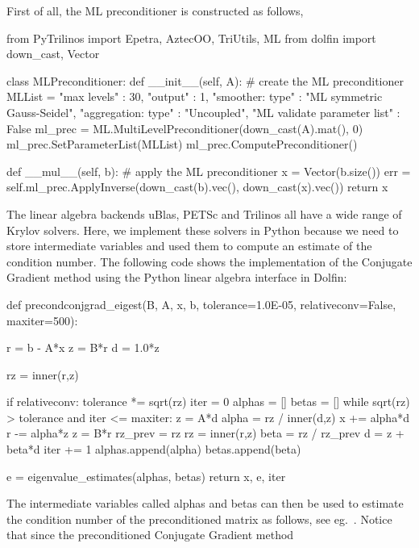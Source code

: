 First of all, the ML preconditioner is constructed as follows,  
\begin{python}
from PyTrilinos import Epetra, AztecOO, TriUtils, ML 
from dolfin import down_cast, Vector 

class MLPreconditioner: 
    def __init__(self, A): 
        # create the ML preconditioner
        MLList = {
              "max levels"        : 30, 
              "output"            : 1,  
              "smoother: type"    : "ML symmetric Gauss-Seidel",
              "aggregation: type" : "Uncoupled",
              "ML validate parameter list" : False
        }
        ml_prec = ML.MultiLevelPreconditioner(down_cast(A).mat(), 0)
        ml_prec.SetParameterList(MLList)
        ml_prec.ComputePreconditioner()

    def __mul__(self, b):
        # apply the ML preconditioner
        x = Vector(b.size())
        err = self.ml_prec.ApplyInverse(down_cast(b).vec(),
                                        down_cast(x).vec())
        return x
\end{python}
The linear algebra backends uBlas, PETSc and Trilinos all have 
a wide range of Krylov solvers. Here, we implement
these solvers in Python because we need to store intermediate
variables and  used them to compute an estimate of the condition number. 
The following code shows the implementation of the Conjugate Gradient method
using the Python linear algebra interface in Dolfin:
\begin{python}
def precondconjgrad_eigest(B, A, x, b, tolerance=1.0E-05, 
                           relativeconv=False, maxiter=500):

    r = b - A*x
    z = B*r
    d = 1.0*z

    rz = inner(r,z)

    if relativeconv: tolerance *= sqrt(rz)
    iter = 0
    alphas = []
    betas = []
    while sqrt(rz) > tolerance and iter <= maxiter:
        z = A*d
        alpha = rz / inner(d,z)
        x += alpha*d
        r -= alpha*z
        z = B*r
        rz_prev = rz
        rz = inner(r,z)
        beta =  rz / rz_prev
        d = z + beta*d
        iter += 1
        alphas.append(alpha)
        betas.append(beta)

    e = eigenvalue_estimates(alphas, betas)
    return x, e, iter
\end{python}
The intermediate variables called alphas and betas can then be used to estimate the condition number of
the preconditioned matrix as follows, see eg.~\citep{Saad2003}. 
Notice that since the preconditioned Conjugate Gradient method 
